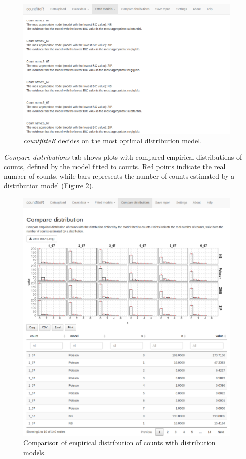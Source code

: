 \begin{figure}[htbp]
  \centering
  \includegraphics[width=0.99\columnwidth]{fig/cf_fm3.png}
  \caption{\emph{countfitteR} decides on the most optimal distribution model.}
    \label{cf_fm3}
\end{figure}

\textit{Compare distributions} tab shows plots with compared empirical distributions of counts, defined by the model fitted to counts. Red points indicate the real number of counts, while bars represents the number of counts estimated by a distribution model (Figure \ref{cf_cmp}).

\begin{figure}[htbp]
  \centering
  \includegraphics[width=0.99\columnwidth]{fig/cf_cmp.png}
  \caption{Comparison of empirical distribution of counts with distribution models.}
    \label{cf_cmp}
\end{figure}

